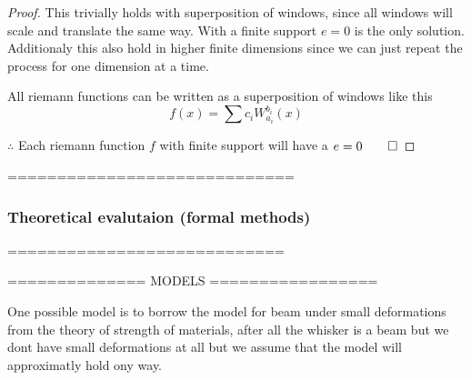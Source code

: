\begin{proof}
  This trivially holds with superposition of windows, since all
  windows will scale and translate the same way.  With a finite
  support $e=0$ is the only solution. Additionaly this also hold in
  higher finite dimensions since we can just repeat the process for
  one dimension at a time.
    
  All riemann functions can be written as a superposition of windows
  like this
  \begin{equation}
    f(x)=\sum{c_iW_{a_i}^{b_i}(x)}
  \end{equation}
  
  $\therefore$ Each riemann function $f$ with finite support will have a $e=0\qed$
  
\end{proof}

=============================

\subsubsection{ Theoretical evalutaion (formal methods)}

============================

============== MODELS =================

One possible model is to borrow the model for beam under small
deformations from the theory of strength of materials, after all the
whisker is a beam but we dont have small deformations at all but we
assume that the model will approximatly hold ony way.


